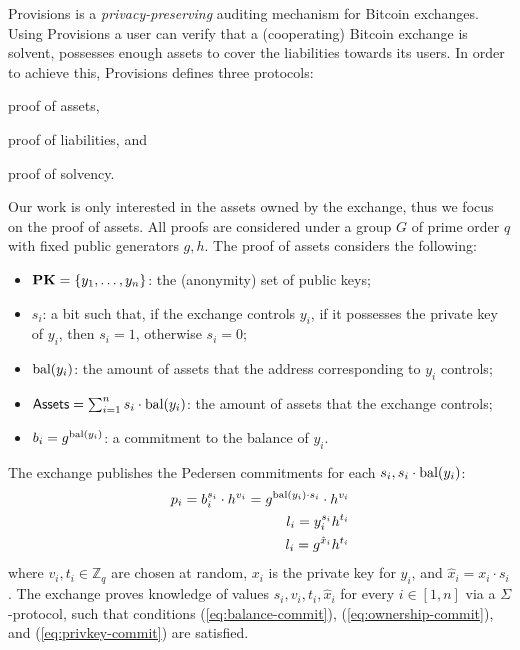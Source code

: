 Provisions is a \emph{privacy-preserving} auditing
mechanism for Bitcoin exchanges. Using Provisions a user can verify that a
(cooperating) Bitcoin exchange is solvent, \ie possesses enough assets to cover
the liabilities towards its users. In order to achieve this, Provisions defines
three protocols:
\begin{inparaenum}[i)]
    \item proof of assets,
    \item proof of liabilities, and
    \item proof of solvency.
\end{inparaenum}
Our work is only interested in the assets owned by the exchange, thus we focus
on the proof of assets. All proofs are considered under a group
$G$ of prime order $q$ with fixed public generators $g, h$. The proof of assets
considers the following:
\begin{itemize}
    \item $\text{\textbf{PK}} = \{y_1, \dots, y_n \}$: the (anonymity) set of public keys;
    \item $s_i$: a bit such that, if the exchange controls $y_i$, \ie if it possesses the private key of $y_i$, then $s_i = 1$, otherwise $s_i = 0$;
    \item $\text{bal}(y_i)$: the amount of assets that the address corresponding to $y_i$ controls;
    \item $\mathsf{Assets} = \sum_{i = 1}^n s_i \cdot \text{bal}(y_i)$: the amount of assets that the exchange controls;
    \item $b_i = g^{\text{bal}(y_i)}$: a commitment to the balance of $y_i$.
\end{itemize}

The exchange publishes the Pedersen commitments for each $s_i, s_i \cdot
\text{bal}(y_i)$:
\begin{align}
    p_i = b_i^{s_i} \cdot h^{v_i} = g^{\text{bal}(y_i) \cdot s_i} \cdot h^{v_i} \label{eq:balance-commit} \\
    l_i = y_i^{s_i}h^{t_i} \label{eq:ownership-commit} \\
    l_i = g^{\hat{x}_i}h^{t_i} \label{eq:privkey-commit}
\end{align}
where $v_i, t_i \in \mathbb{Z}_q$ are chosen at random,
$x_i$ is the private key for $y_i$, and $\hat{x}_i = x_i \cdot s_i$.
The exchange proves knowledge of values $s_i, v_i, t_i, \hat{x}_i$ for every $i
\in [1, n]$ via a $\Sigma$-protocol, such that conditions
(\ref{eq:balance-commit}), (\ref{eq:ownership-commit}), and
(\ref{eq:privkey-commit}) are satisfied.

